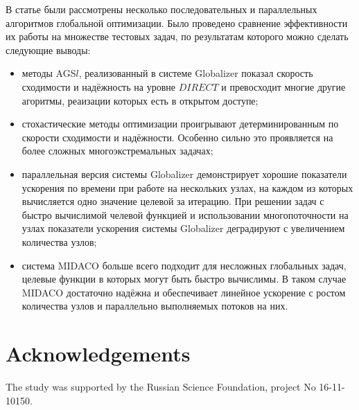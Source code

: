 \documentclass{svproc}
\begin{document}
\begin{Russian}
В статье были рассмотрены несколько последовательных и параллельных алгоритмов глобальной оптимизации.
Было проведено сравнение эффективности их работы на множестве тестовых задач, по результатам которого можно сделать
следующие выводы:
\begin{itemize}
  \item методы AGS\(l\), реализованный в системе Globalizer показал скорость сходимости и надёжность на уровне \(DIRECT\) и
  превосходит многие другие агоритмы, реаизации которых есть в открытом доступе;
  \item стохастические методы оптимизации проигрывают детерминированным по скорости сходимости и надёжности. Особенно
  сильно это проявляется на более сложных многоэкстремальных задачах;
  \item параллельная версия системы Globalizer демонстрирует хорошие показатели ускорения по времени при работе на нескольких узлах,
  на каждом из которых вычисляется одно значение целевой за итерацию. При решении задач с быстро вычислимой челевой функцией и
  использовании многопоточности на узлах показатели ускорения системы Globalizer деградируют с увеличением количества узлов;
  \item система MIDACO больше всего подходит для несложных глобальных задач, целевые функции в которых могут быть быстро вычислимы.
  В таком случае MIDACO достаточно надёжна и обеспечивает линейное ускорение с ростом количества узлов и параллельно выполняемых потоков на них.
\end{itemize}

\end{Russian}

\section*{Acknowledgements}
The study was supported by the Russian Science Foundation, project No 16-11-
10150.

%

{}
\end{document}
